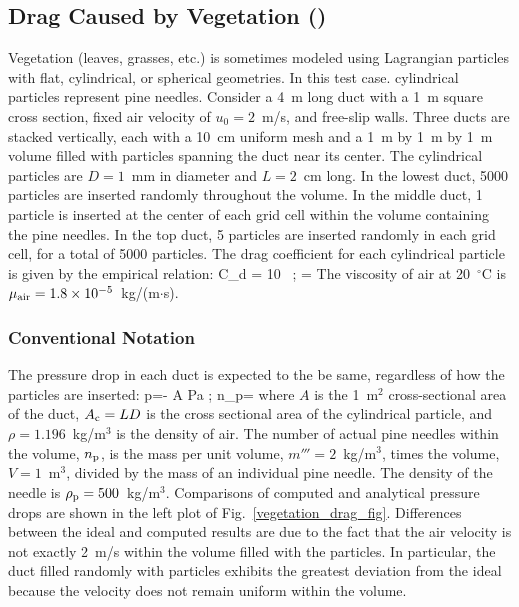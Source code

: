 \documentclass[11pt]{book}
\begin{document}
\subsection{Drag Caused by Vegetation (\texorpdfstring{}{vegetation\_drag})}
\label{vegetation_drag_1}
\label{vegetation_drag_2}

Vegetation (leaves, grasses, etc.) is sometimes modeled using Lagrangian particles with flat, cylindrical, or spherical geometries. In this test case. cylindrical particles represent pine needles. Consider a 4~m long duct with a 1~m square cross section, fixed air velocity of $u_0=2$~m/s, and free-slip walls. Three ducts are stacked vertically, each with a 10~cm uniform mesh and a 1~m by 1~m by 1~m volume filled with particles spanning the duct near its center. The cylindrical particles are $D=1$~mm in diameter and $L=2$~cm long. In the lowest duct, 5000 particles are inserted randomly throughout the volume. In the middle duct, 1 particle is inserted at the center of each grid cell within the volume containing the pine needles. In the top duct, 5 particles are inserted randomly in each grid cell, for a total of 5000 particles. The drag coefficient for each cylindrical particle is given by the empirical relation:
\be
   C_{\rm d} = 10 \,   \quad ; \quad \RE =  
\ee
The viscosity of air at 20~$^\circ$C is $\mu_{\rm air}=1.8\times 10^{-5}$~kg/(m$\cdot$s).

\subsubsection{Conventional Notation}

The pressure drop in each duct is expected to the be same, regardless of how the particles are inserted:
\be
   \Delta p=- \rho {} {A}  \; {\rm Pa}  \quad ; \quad n_{\rm p}=   \label{pressure_drop_1}
\ee
where $A$ is the 1~m$^2$ cross-sectional area of the duct, $A_{\rm c}=LD$ is the cross sectional area of the cylindrical particle, and $\rho=1.196$~kg/m$^3$ is the density of air. The number of actual pine needles within the volume, $n_{\rm p}$, is the mass per unit volume, $m'''=2$~kg/m$^3$, times the volume, $V=1$~m$^3$, divided by the mass of an individual pine needle. The density of the needle is $\rho_{\rm p}=500$~kg/m$^3$. Comparisons of computed and analytical pressure drops are shown in the left plot of Fig.~\ref{vegetation_drag_fig}. Differences between the ideal and computed results are due to the fact that the air velocity is not exactly 2~m/s within the volume filled with the particles. In particular, the duct filled randomly with particles exhibits the greatest deviation from the ideal because the velocity does not remain uniform within the volume.
\end{document}
